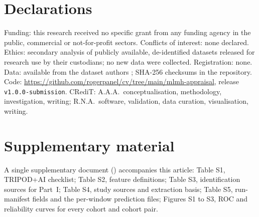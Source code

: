 \documentclass[11pt,a4paper]{article}
\begin{document}
\section*{Declarations}
Funding: this research received no specific grant from any funding agency in the public,
commercial or not-for-profit sectors. Conflicts of interest: none declared. Ethics: secondary
analysis of publicly available, de-identified datasets released for research use by their
custodians; no new data were collected. Registration: none.
Data: available from the dataset authors \cite{garciaceja2018,jakobsen2020,hicks2021,obf2025};
SHA-256 checksums in the repository. Code:
\url{https://github.com/rogerpanel/cv/tree/main/mlmh-appraisal}, release \texttt{v1.0.0-submission}.
CRediT: A.A.A.\ conceptualisation, methodology, investigation, writing; R.N.A.\ software,
validation, data curation, visualisation, writing.
\section*{Supplementary material}
A single supplementary document () accompanies this article: Table S1,
TRIPOD+AI checklist; Table S2, feature definitions; Table S3, identification sources for Part~I;
Table S4, study sources and extraction basis; Table S5, run-manifest fields and the per-window
prediction files; Figures S1 to S3, ROC and reliability curves for every cohort and cohort pair.
\end{document}
